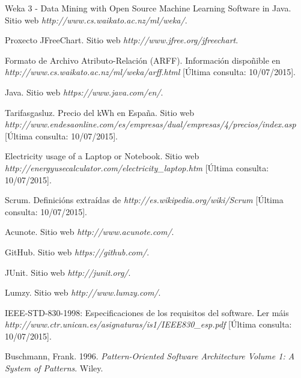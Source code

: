 

\begin{thebibliography}{99}

 Weka 3 - Data Mining with Open Source Machine Learning Software in Java. Sitio web {\it http://www.cs.waikato.ac.nz/ml/weka/}.

 Proxecto JFreeChart. Sitio web {\it http://www.jfree.org/jfreechart}.

 Formato de Archivo Atributo-Relación (ARFF). Información dispoñible en {\it http://www.cs.waikato.ac.nz/ml/weka/arff.html} [Última consulta: 10/07/2015].

 Java. Sitio web {\it https://www.java.com/en/}.

 Tarifasgasluz. Precio del kWh en España. Sitio web {\it http://www.endesaonline.com/es/empresas/dual/empresas/4/precios/index.asp} [Última consulta: 10/07/2015].

 Electricity usage of a Laptop or Notebook. Sitio web {\it http://energyusecalculator.com/electricity\_laptop.htm} [Última consulta: 10/07/2015].

 Scrum. Definicións extraídas de {\it http://es.wikipedia.org/wiki/Scrum} [Última consulta: 10/07/2015].

 Acunote. Sitio web {\it http://www.acunote.com/}.

 GitHub. Sitio web {\it https://github.com/}.

 JUnit. Sitio web {\it http://junit.org/}.

 Lumzy. Sitio web {\it http://www.lumzy.com/}.

 IEEE-STD-830-1998: Especificaciones de los requisitos del software. Ler máis {\it http://www.ctr.unican.es/asignaturas/is1/IEEE830\_esp.pdf} [Última consulta: 10/07/2015].

 Buschmann, Frank. 1996. \textit{Pattern-Oriented Software Architecture Volume 1: A System of Patterns}. Wiley. 

\end{thebibliography}

